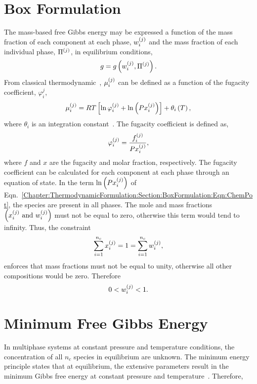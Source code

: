 \section{Box Formulation}\label{Chapter:ThermodynamicFormulation:Section:BoxFormulation}
The mass-based free Gibbs energy may be expressed a function of the mass fraction of each component at each phase, $\mfr[w]{i}{j}$ and the mass fraction of each individual phase, $\mfr[\Pi]{}{j}$, in equilibrium conditions,
\begin{displaymath}
   g = g\left(\mfr[w]{i}{j},\mfr[\Pi]{}{j}\right).
\end{displaymath}
From classical thermodynamic~\cite{Balmer_Book}, $\mfr[\mu]{i}{j}$ can be defined as a function of the fugacity coefficient, $\varphi_{i}^{j}$,
\begin{equation}
   \mfr[\mu]{i}{j}= R T\left[\ln{\mfr[\varphi]{i}{j}} + \ln{\left(P \mfr[x]{i}{j}\right)}\right] + \theta_{i}\left(T\right),\label{Chapter:ThermodynamicFormulation:Section:BoxFormulation:Eqn:ChemPot}
\end{equation}
where $\theta_{i}$ is an integration constant~\cite{SmithVanNess_Book}. The fugacity coefficient is defined as,
\begin{equation}
   \mfr[\varphi]{i}{j} = \frc{\mfr[f]{i}{j}}{P \mfr[x]{i}{j}},\label{Chapter:ThermodynamicFormulation:Section:BoxFormulation:Eqn:FugacityCoeff}
\end{equation}
where $f$ and $x$ are the fugacity and molar fraction, respectively. The fugacity coefficient can be calculated for each component at each phase through an equation of state. In the term $\ln{\left(P\mfr[x]{i}{j}\right)}$ of Eqn.~\ref{Chapter:ThermodynamicFormulation:Section:BoxFormulation:Eqn:ChemPot}, the species are present in all phases. The mole and mass fractions $\left(\mfr[x]{i}{j}\text{ and }\mfr[w]{i}{j}\right)$ must not be equal to zero, otherwise this term would tend to infinity. Thus, the constraint
  \begin{displaymath}
    \summation_{i=1}^{n_{c}} \mfr[x]{i}{j} = 1 = \summation_{i=1}^{n_{c}} \mfr[w]{i}{j},
  \end{displaymath}
enforces that mass fractions must not be equal to unity, otherwise all other compositions would be zero. Therefore
   \begin{displaymath}
        0 < \mfr[w]{i}{j} < 1.
   \end{displaymath}

\section{Minimum Free Gibbs Energy}\label{Chapter:ThermodynamicFormulation:Section:MinimumGibbsEnergy}
In multiphase systems at constant pressure and temperature conditions, the concentration of all $n_{c}$ species in equilibrium are unknown. The minimum energy principle states that at equilibrium, the extensive parameters result in the minimum Gibbs free energy at constant pressure and temperature~\cite{Callen_Book}. Therefore,  

